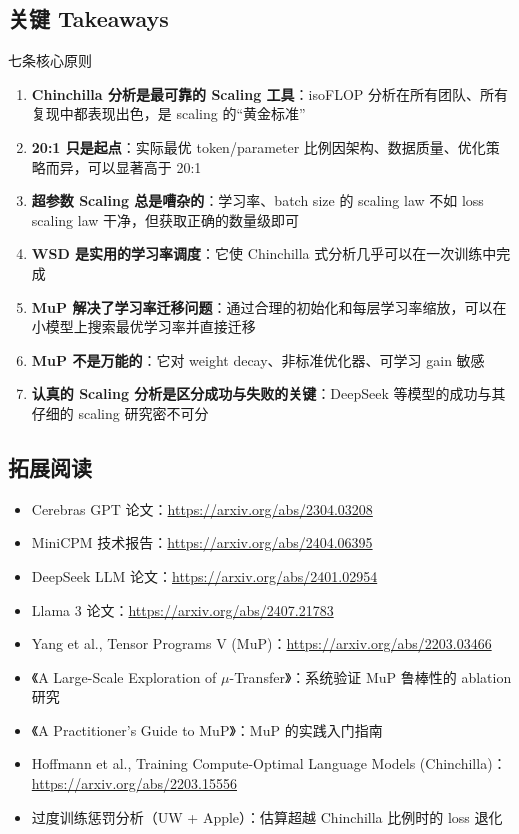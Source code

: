 \documentclass[a4paper]{article}
\begin{document}
\subsection{关键 Takeaways}

\begin{importantbox}{七条核心原则}
\begin{enumerate}
    \item \textbf{Chinchilla 分析是最可靠的 Scaling 工具}：isoFLOP 分析在所有团队、所有复现中都表现出色，是 scaling 的``黄金标准''
    \item \textbf{20:1 只是起点}：实际最优 token/parameter 比例因架构、数据质量、优化策略而异，可以显著高于 20:1
    \item \textbf{超参数 Scaling 总是嘈杂的}：学习率、batch size 的 scaling law 不如 loss scaling law 干净，但获取正确的数量级即可
    \item \textbf{WSD 是实用的学习率调度}：它使 Chinchilla 式分析几乎可以在一次训练中完成
    \item \textbf{MuP 解决了学习率迁移问题}：通过合理的初始化和每层学习率缩放，可以在小模型上搜索最优学习率并直接迁移
    \item \textbf{MuP 不是万能的}：它对 weight decay、非标准优化器、可学习 gain 敏感
    \item \textbf{认真的 Scaling 分析是区分成功与失败的关键}：DeepSeek 等模型的成功与其仔细的 scaling 研究密不可分
\end{enumerate}
\end{importantbox}

\subsection{拓展阅读}

\begin{itemize}
    \item Cerebras GPT 论文：\url{https://arxiv.org/abs/2304.03208}
    \item MiniCPM 技术报告：\url{https://arxiv.org/abs/2404.06395}
    \item DeepSeek LLM 论文：\url{https://arxiv.org/abs/2401.02954}
    \item Llama 3 论文：\url{https://arxiv.org/abs/2407.21783}
    \item Yang et al., Tensor Programs V (MuP)：\url{https://arxiv.org/abs/2203.03466}
    \item 《A Large-Scale Exploration of $\mu$-Transfer》：系统验证 MuP 鲁棒性的 ablation 研究
    \item 《A Practitioner's Guide to MuP》：MuP 的实践入门指南
    \item Hoffmann et al., Training Compute-Optimal Language Models (Chinchilla)：\url{https://arxiv.org/abs/2203.15556}
    \item 过度训练惩罚分析（UW + Apple）：估算超越 Chinchilla 比例时的 loss 退化
\end{itemize}
\end{document}
